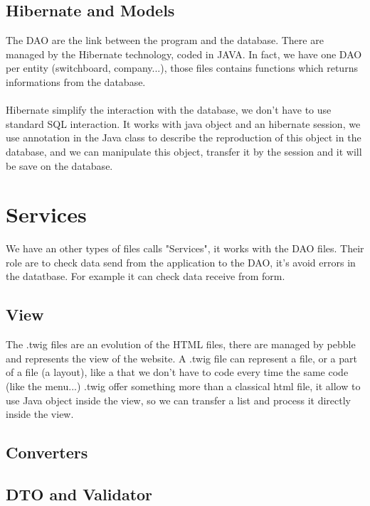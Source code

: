 \subsection{Hibernate and Models}

The DAO are the link between the program and the database. There are managed by the Hibernate technology, coded in JAVA.
In fact, we have one DAO per entity (switchboard, company...), those files contains functions which returns informations from the database.
\\
\\
Hibernate simplify the interaction with the database, we don't have to use standard SQL interaction.
It works with java object and an hibernate session, we use annotation in the Java class to describe the reproduction of this object in the database,
and we can manipulate this object, transfer it by the session and it will be save on the database.

\section{Services}

We have an other types of files calls "Services", it works with the DAO files.
Their role are to check data send from the application to the DAO, it's avoid errors in the datatbase.
For example it can check data receive from form.


\subsection{View}

The .twig files are an evolution of the HTML files, there are managed by pebble and represents the view of the website.
A .twig file can represent a file, or a part of a file (a layout), like a that we don't have to code every time the same code (like the menu...)
.twig offer something more than a classical html file, it allow to use Java object inside the view, so we can transfer a list and process it directly inside the view.


\subsection{Converters}

\subsection{DTO and Validator}

